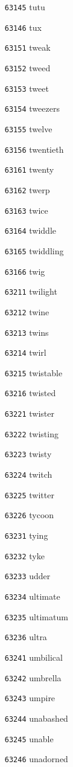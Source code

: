 \documentclass[twoside,11pt]{article}
\begin{document}
\begin{multicols}{5}
\begin{enumerate}
\item[\texttt{63145}] tutu
\item[\texttt{63146}] tux
\item[\texttt{63151}] tweak
\item[\texttt{63152}] tweed
\item[\texttt{63153}] tweet
\item[\texttt{63154}] tweezers
\item[\texttt{63155}] twelve
\item[\texttt{63156}] twentieth
\item[\texttt{63161}] twenty
\item[\texttt{63162}] twerp
\item[\texttt{63163}] twice
\item[\texttt{63164}] twiddle
\item[\texttt{63165}] twiddling
\item[\texttt{63166}] twig
\item[\texttt{63211}] twilight
\item[\texttt{63212}] twine
\item[\texttt{63213}] twins
\item[\texttt{63214}] twirl
\item[\texttt{63215}] twistable
\item[\texttt{63216}] twisted
\item[\texttt{63221}] twister
\item[\texttt{63222}] twisting
\item[\texttt{63223}] twisty
\item[\texttt{63224}] twitch
\item[\texttt{63225}] twitter
\item[\texttt{63226}] tycoon
\item[\texttt{63231}] tying
\item[\texttt{63232}] tyke
\item[\texttt{63233}] udder
\item[\texttt{63234}] ultimate
\item[\texttt{63235}] ultimatum
\item[\texttt{63236}] ultra
\item[\texttt{63241}] umbilical
\item[\texttt{63242}] umbrella
\item[\texttt{63243}] umpire
\item[\texttt{63244}] unabashed
\item[\texttt{63245}] unable
\item[\texttt{63246}] unadorned

\end{enumerate}
\end{multicols}
\end{document}
